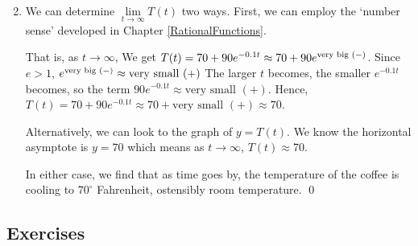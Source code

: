 \documentclass{ximera}
\begin{document}
\begin{ex}
\begin{enumerate}
\[\begin{array}{ccc}
\end{array}\]

\item  We can determine $\lim\limits_{t \rightarrow \infty} T(t)$ two ways.  First, we can employ  the `number sense' developed in Chapter \ref{RationalFunctions}.    

\smallskip

That is, as $t \rightarrow \infty$, We get $T(t) = 70+90e^{-0.1t} \approx 70 +90e^{\mbox{\scriptsize very big $(-)$}}$.  Since $e > 1$, $e^{\mbox{\scriptsize very big $(-)$}}  \approx \mbox{very small $(+)$}$  The larger $t$ becomes, the smaller $e^{-0.1t}$ becomes, so the term $90 e^{-0.1t} \approx \mbox{very small $(+)$}$.  Hence, $T(t) = 70+90e^{-0.1t}  \approx 70 +  \mbox{very small $(+)$} \approx 70$. 

\smallskip

Alternatively, we can look to the graph of $y = T(t)$.  We know the horizontal asymptote is $y=70$ which means as $t \rightarrow \infty$, $T(t) \approx 70$.

\smallskip

In either case, we find that as time goes by,  the temperature of the coffee is cooling to $70^{\circ}$ Fahrenheit, ostensibly room temperature. \qed

\end{enumerate}

\end{ex}

\newpage

\subsection{Exercises}



\closegraphsfile
\end{document}
